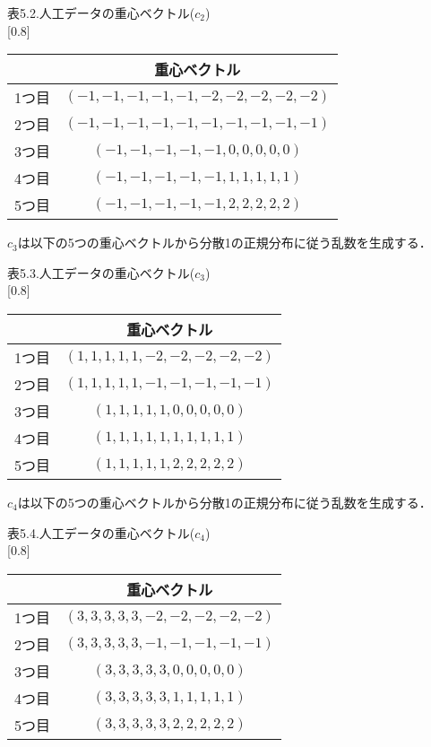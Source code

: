\begin{center}
表5.2.人工データの重心ベクトル($c_2$)\\
\scalebox{0.75}[0.8]{
\begin{tabular}{|c|c|}
\hline
&重心ベクトル\\
\hline\hline
1つ目&$(-1,-1,-1,-1,-1,-2,-2,-2,-2,-2)$\\
\hline
2つ目&$(-1,-1,-1,-1,-1,-1,-1,-1,-1,-1)$\\
\hline
3つ目&$(-1,-1,-1,-1,-1,0,0,0,0,0)$\\
\hline
4つ目&$(-1,-1,-1,-1,-1,1,1,1,1,1)$\\
\hline
5つ目&$(-1,-1,-1,-1,-1,2,2,2,2,2)$\\
\hline
\end{tabular}
}
\end{center}\par

$c_3$は以下の5つの重心ベクトルから分散1の正規分布に従う乱数を生成する．\par

\begin{center}
表5.3.人工データの重心ベクトル($c_3$)\\
\scalebox{0.75}[0.8]{
\begin{tabular}{|c|c|}
\hline
&重心ベクトル\\
\hline\hline
1つ目&$(1,1,1,1,1,-2,-2,-2,-2,-2)$\\
\hline
2つ目&$(1,1,1,1,1,-1,-1,-1,-1,-1)$\\
\hline
3つ目&$(1,1,1,1,1,0,0,0,0,0)$\\
\hline
4つ目&$(1,1,1,1,1,1,1,1,1,1)$\\
\hline
5つ目&$(1,1,1,1,1,2,2,2,2,2)$\\
\hline
\end{tabular}
}
\end{center}\par

$c_4$は以下の5つの重心ベクトルから分散1の正規分布に従う乱数を生成する．\par

\begin{center}
表5.4.人工データの重心ベクトル($c_4$)\\
\scalebox{0.75}[0.8]{
\begin{tabular}{|c|c|}
\hline
&重心ベクトル\\
\hline\hline
1つ目&$(3,3,3,3,3,-2,-2,-2,-2,-2)$\\
\hline
2つ目&$(3,3,3,3,3,-1,-1,-1,-1,-1)$\\
\hline
3つ目&$(3,3,3,3,3, 0, 0, 0, 0, 0)$\\
\hline
4つ目&$(3,3,3,3,3, 1, 1, 1, 1, 1)$\\
\hline
5つ目&$(3,3,3,3,3, 2, 2, 2, 2, 2)$\\
\hline
\end{tabular}
}
\end{center}\par


